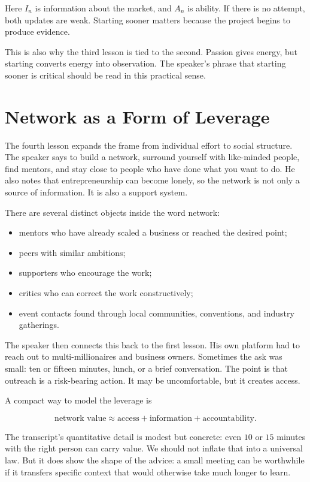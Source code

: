 Here \(I_n\) is information about the market, and \(A_n\) is ability. If there is no attempt, both updates are weak. Starting sooner matters because the project begins to produce evidence.

This is also why the third lesson is tied to the second. Passion gives energy, but starting converts energy into observation. The speaker's phrase that starting sooner is critical should be read in this practical sense.

\section{Network as a Form of Leverage}

The fourth lesson expands the frame from individual effort to social structure. The speaker says to build a network, surround yourself with like-minded people, find mentors, and stay close to people who have done what you want to do. He also notes that entrepreneurship can become lonely, so the network is not only a source of information. It is also a support system.

There are several distinct objects inside the word network:

\begin{itemize}
\item mentors who have already scaled a business or reached the desired point;
\item peers with similar ambitions;
\item supporters who encourage the work;
\item critics who can correct the work constructively;
\item event contacts found through local communities, conventions, and industry gatherings.
\end{itemize}

The speaker then connects this back to the first lesson. His own platform had to reach out to multi-millionaires and business owners. Sometimes the ask was small: ten or fifteen minutes, lunch, or a brief conversation. The point is that outreach is a risk-bearing action. It may be uncomfortable, but it creates access.

A compact way to model the leverage is

\begin{equation}
\text{network value}
\approx
\text{access}
+
\text{information}
+
\text{accountability}.
\end{equation}

The transcript's quantitative detail is modest but concrete: even \(10\) or \(15\) minutes with the right person can carry value. We should not inflate that into a universal law. But it does show the shape of the advice: a small meeting can be worthwhile if it transfers specific context that would otherwise take much longer to learn.

